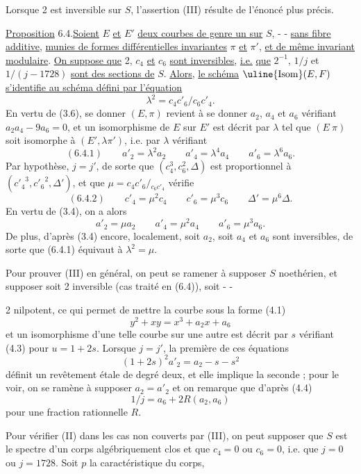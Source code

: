 Lorsque 2 est inversible sur $S$, l'assertion (III) résulte de l'énoncé plus précis.

\uline{Proposition} 6.4.\quad \uline{Soient} $E$ \uline{et} $E'$ \uline{deux courbes de genre un sur} $S$,
-  -
\uline{sans fibre additive}, \uline{munies de formes différentielles invariantes} $\pi$ \uline{et} $\pi'$, \uline{et de même invariant modulaire}. \uline{On suppose que} 2, $c_4$ \uline{et} $c_6$ \uline{sont inversibles}, \uline{i.e.} \uline{que} $2^{-1}$, $1/j$ et $1/(j-1728)$ \uline{sont des sections de} $S$. \uline{Alors}, \uline{le schéma} $\uline{\mathrm{Isom}}(E,F)$ \uline{s'identifie au schéma défini par l'équation}
\[
\lambda^2=c_4c'_6/c_6c'_4.
\]
En vertu de (3.6), se donner $(E,\pi)$ revient à se donner $a_2$, $a_4$ et $a_6$ vérifiant $a_2a_4-9a_6=0$, et un isomorphisme de $E$ sur $E'$ est décrit par $\lambda$ tel que $(E\ \pi)$ soit isomorphe à $(E',\lambda\pi')$, i.e. par $\lambda$ vérifiant
\[
(6.4.1)\qquad a'_2=\lambda^2a_2\qquad a'_4=\lambda^4a_4\qquad a'_6=\lambda^6a_6.
\]
Par hypothèse, $j=j'$, de sorte que $(c_4^3,c_6^2,\Delta)$ est proportionnel à $({c'_4}^3,{c'_6}^2,\Delta')$, et que $\mu=c_4c'_6/{}_{c_6c'_4}$ vérifie
\[
(6.4.2)\qquad c'_4=\mu^2c_4\qquad c'_6=\mu^3c_6\qquad\Delta'=\mu^6\Delta.
\]
En vertu de (3.4), on a alors
\[
a'_2=\mu a_2\qquad a'_4=\mu^2a_4\qquad a'_6=\mu^3a_6.
\]
De plus, d'après (3.4) encore, localement, soit $a_2$, soit $a_4$ et $a_6$ sont inversibles, de sorte que (6.4.1) équivaut à $\lambda^2=\mu$.

Pour prouver (III) en général, on peut se ramener à supposer $S$ noethérien, et supposer soit 2 inversible (cas traité en (6.4)), soit
-  -

2 nilpotent, ce qui permet de mettre la courbe sous la forme (4.1)
\[
y^2+xy=x^3+a_2x+a_6
\]
et un isomorphisme d'une telle courbe sur une autre est décrit par $s$ vérifiant (4.3) pour $u=1+2s$. Lorsque $j=j'$, la première de ces équations
\[
(1+2s)^2a'_2=a_2-s-s^2
\]
définit un revêtement étale de degré deux, et elle implique la seconde ; pour le voir, on se ramène à supposer $a_2=a'_2$ et on remarque que d'après (4.4)
\[
1/j=a_6+2R(a_2,a_6)
\]
pour une fraction rationnelle $R$.

Pour vérifier (II) dans les cas non couverts par (III), on peut supposer que $S$ est le spectre d'un corps algébriquement clos et que $c_4=0$ ou $c_6=0$, i.e. que $j=0$ ou $j=1728$. Soit $p$ la caractéristique du corps,

